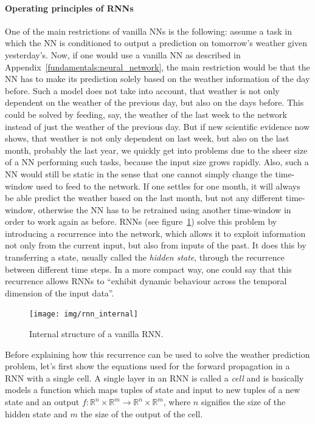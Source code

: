 \paragraph{Operating principles of RNNs}
One of the main restrictions of vanilla NNs is the following: assume a task in which the NN is conditioned to output a prediction on tomorrow's weather given yesterday's. Now, if one would use a vanilla NN as described in Appendix~\ref{fundamentals:neural_network}, the main restriction would be that the NN has to make its prediction solely based on the weather information of the day before. Such a model does not take into account, that weather is not only dependent on the weather of the previous day, but also on the days before. This could be solved by feeding, say, the weather of the last week to the network instead of just the weather of the previous day. But if new scientific evidence now shows, that weather is not only dependent on last week, but also on the last month, probably the last year, we quickly get into problems due to the sheer size of a NN performing such tasks, because the input size grows rapidly. Also, such a NN would still be static in the sense that one cannot simply change the time-window used to feed to the network. If one settles for one month, it will always be able predict the weather based on the last month, but not any different time-window, otherwise the NN has to be retrained using another time-window in order to work again as before. RNNs (see figure~\ref{fundamentals:rnn:internal_structure}) solve this problem by introducing a recurrence into the network, which allows it to exploit information not only from the current input, but also from inputs of the past. It does this by transferring a state, usually called the \emph{hidden state}, through the recurrence between different time steps. In a more compact way, one could say that this recurrence allows RNNs to ``exhibit dynamic behaviour across the temporal dimension of the input data''.

\begin{figure}[h]
	\label{fundamentals:rnn:internal_structure}
	\centering
	\texttt{[image: img/rnn\_internal]}
	\caption{Internal structure of a vanilla RNN.\protect\footnotemark}
\end{figure}

Before explaining how this recurrence can be used to solve the weather prediction problem, let's first show the equations used for the forward propagation in a RNN with a single cell. A single layer in an RNN is called a \emph{cell} and is basically models a function which maps tuples of state and input to new tuples of a new state and an output $f\colon \mathbb{R}^n \times \mathbb{R}^m \rightarrow \mathbb{R}^n \times \mathbb{R}^m$, where $n$ signifies the size of the hidden state and $m$ the size of the output of the cell.

